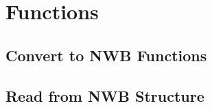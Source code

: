 \documentclass[letterpaper,10pt,english]{sphinxmanual}
\begin{document}
\chapter{Functions}
\label{\detokenize{functions:functions}}\label{\detokenize{functions::doc}}

\section{Convert to NWB Functions}
\label{\detokenize{function_convert:convert-to-nwb-functions}}\label{\detokenize{function_convert::doc}}

\section{Read from NWB Structure}
\label{\detokenize{function_read:read-from-nwb-structure}}\label{\detokenize{function_read::doc}}


\renewcommand{\indexname}{Index}
\printindex
\end{document}
